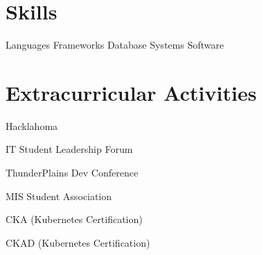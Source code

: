 \documentclass[letterpaper]{resumeconfig}
\begin{document}
\vspace{-0.8em}
\section{Skills}

\begin{Skills}
	\SkillCategory
	{Languages}
	{
		      
	}
	\SkillCategory
	{Frameworks}
	{
		      
	}
	\SkillCategory
	{Database Systems}
	{
		     
	}
	\SkillCategory
	{Software}
	{
		      
	}	
\end{Skills}
\vspace{-0.8em}


\section{Extracurricular Activities}

    \begin{ActivitiesList}
        \item Hacklahoma
        \item IT Student Leadership Forum
        \item ThunderPlains Dev Conference
        \item MIS Student Association
        \item CKA (Kubernetes Certification)
        \item CKAD (Kubernetes Certification)
    \end{ActivitiesList}
\end{document}
